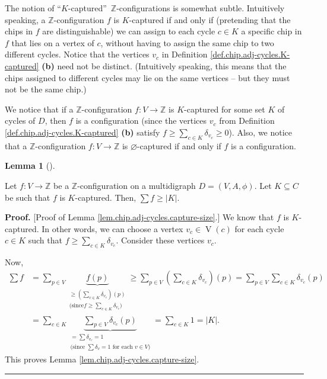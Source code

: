 \documentclass[numbers=enddot,12pt,final,onecolumn,notitlepage]{scrartcl}%
\theoremstyle{definition}
\newtheorem{lem}[theo]{Lemma}
\newenvironment{lemma}[1][]
{\begin{lem}[#1]\begin{leftbar}}
{\end{leftbar}\end{lem}}
\newenvironment{proof}[1][Proof]{\noindent\textbf{#1.} }{\ \rule{0.5em}{0.5em}}
\let\sumnonlimits\sum
\renewcommand{\sum}{\sumnonlimits\limits}
\newcommand{\ZZ}{\mathbb{Z}}
\begin{document}
The notion of \textquotedblleft$K$-captured\textquotedblright\ $\ZZ%
$-configurations is somewhat subtle. Intuitively speaking, a $\mathbb{Z}%
$-configuration $f$ is $K$-captured if and only if (pretending that the chips
in $f$ are distinguishable) we can assign to each cycle $c\in K$ a specific
chip in $f$ that lies on a vertex of $c$, without having to assign the same
chip to two different cycles. Notice that the vertices $v_{c}$ in Definition
\ref{def.chip.adj-cycles.K-captured} \textbf{(b)} need not be distinct.
(Intuitively speaking, this means that the chips assigned to different cycles
may lie on the same vertices -- but they must not be the same chip.)

We notice that if a $\mathbb{Z}$-configuration $f:V\rightarrow\mathbb{Z}$ is
$K$-captured for some set $K$ of cycles of $D$, then $f$ is a configuration
(since the vertices $v_{c}$ from Definition
\ref{def.chip.adj-cycles.K-captured} \textbf{(b)} satisfy $f\geq\sum_{c\in
K}\delta_{v_{c}}\geq0$). Also, we notice that a $\mathbb{Z}$-configuration
$f:V\rightarrow\mathbb{Z}$ is $\varnothing$-captured if and only if $f$ is a configuration.

\begin{lemma}
\label{lem.chip.adj-cycles.capture-size}Let $f:V\rightarrow\mathbb{Z}$ be a
$\ZZ$-configuration on a multidigraph $D=\left(  V,A,\phi\right)  $. Let
$K\subseteq C$ be such that $f$ is $K$-captured. Then, $\sum f\geq\left\vert
K\right\vert $.
\end{lemma}

\begin{proof}
[Proof of Lemma \ref{lem.chip.adj-cycles.capture-size}.] We know that $f$ is
$K$-captured. In other words, we can choose a vertex $v_{c}\in
\operatorname*{V}\left(  c\right)  $ for each cycle $c\in K$ such that
$f\geq\sum_{c\in K}\delta_{v_{c}}$. Consider these vertices $v_{c}$.

Now,%
\begin{align*}
\sum f  & =\sum_{p\in V}\underbrace{f\left(  p\right)  }_{\substack{\geq
\left(  \sum_{c\in K}\delta_{v_{c}}\right)  \left(  p\right)  \\\text{(since
}f\geq\sum_{c\in K}\delta_{v_{c}}\text{)}}}\geq\sum_{p\in V}\left(  \sum_{c\in
K}\delta_{v_{c}}\right)  \left(  p\right)  =\sum_{p\in V}\sum_{c\in K}%
\delta_{v_{c}}\left(  p\right)  \\
& =\sum_{c\in K}\underbrace{\sum_{p\in V}\delta_{v_{c}}\left(  p\right)
}_{\substack{=\sum\delta_{v_{c}}=1\\\text{(since }\sum\delta_{v}=1\text{ for
each }v\in V\text{)}}}=\sum_{c\in K}1=\left\vert K\right\vert .
\end{align*}
This proves Lemma \ref{lem.chip.adj-cycles.capture-size}.
\end{proof}
\end{document}
